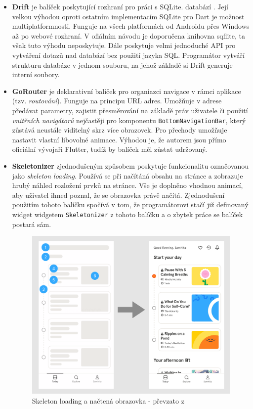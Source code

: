 \documentclass[
  biblatex,
  figures=true,
  tables=false,
  glossaries,
  index
]{kidiplom}
\begin{document}
\begin{itemize}
  \item \textbf{Drift} je balíček poskytující rozhraní pro práci s SQLite.  databází \cite{drift}. Její velkou výhodou oproti ostatním implementacím SQLite pro Dart je možnost multiplatformnosti. Funguje na všech platformách od Androidu přes Windows až po webové rozhraní. V ofiálním návodu je doporučena knihovna sqflite, ta však tuto výhodu neposkytuje. Dále poskytuje velmi jednoduché API pro vytváření dotazů nad databází bez použití jazyka SQL. Programátor vytváří strukturu databáze v jednom souboru, na jehož základě si Drift generuje interní soubory.
  \item \textbf{GoRouter} je deklarativní balíček pro organiazci navigace v rámci aplikace (tzv. \textit{routování}). Funguje na principu URL adres. Umožňuje v adrese předávat parametry, zajistit přesměrování na základě práv uživatele či použití \textit{vnitřních navigátorů} nejčastěji pro komponentu \verb|BottomNavigationBar|, který zůstává neustále viditelný skrz více obrazovek. Pro přechody umožňuje nastavit vlastní libovolné animace. Výhodou je, že autorem jsou přímo oficiální vývojaři Flutter, tudíž by balíček měl zůstat udržovaný.
  \item \textbf{Skeletonizer} zjednodušeným způsobem poskytuje funkcionalitu označovanou jako \textit{skeleton loading}. Používá se při načítáná obsahu na stránce a zobrazuje hrubý náhled rozložení prvků na stránce. Vše je doplněno vhodnou animací, aby uživatel ihned poznal, že se obrazovka právě načítá. Zjednodušení použitím tohoto balíčku spočívá v tom, že programátorovi stačí již definovaný widget  widgetem \verb|Skeletonizer| z tohoto balíčku a o zbytek práce se balíček postará sám.
  
  \begin{figure}
  	\centering
  	\includegraphics[scale=0.1]{images/skeletonizer.png}
  	\caption{Skeleton loading a načtená obrazovka - převzato z \cite{skeleton}}
  \end{figure}
  

\end{itemize}
\end{document}
